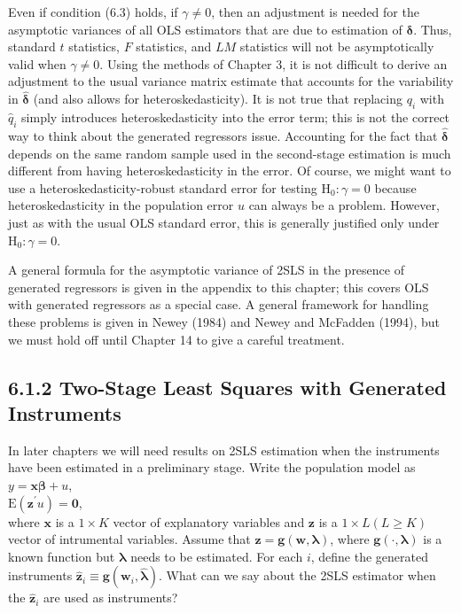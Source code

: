 \documentclass[10pt]{article}
\begin{document}
Even if condition (6.3) holds, if $\gamma \neq 0$, then an adjustment is needed for the asymptotic variances of all OLS estimators that are due to estimation of $\boldsymbol{\delta}$. Thus, standard $t$ statistics, $F$ statistics, and $L M$ statistics will not be asymptotically valid when $\gamma \neq 0$. Using the methods of Chapter 3, it is not difficult to derive an adjustment to the usual variance matrix estimate that accounts for the variability in $\hat{\boldsymbol{\delta}}$ (and also allows for heteroskedasticity). It is not true that replacing $q_{i}$ with $\hat{q}_{i}$ simply introduces heteroskedasticity into the error term; this is not the correct way to think about the generated regressors issue. Accounting for the fact that $\hat{\boldsymbol{\delta}}$ depends on the same random sample used in the second-stage estimation is much different from having heteroskedasticity in the error. Of course, we might want to use a heteroskedasticity-robust standard error for testing $\mathrm{H}_{0}: \gamma=0$ because heteroskedasticity in the population error $u$ can always be a problem. However, just as with the usual OLS standard error, this is generally justified only under $\mathrm{H}_{0}: \gamma=0$.

A general formula for the asymptotic variance of 2SLS in the presence of generated regressors is given in the appendix to this chapter; this covers OLS with generated regressors as a special case. A general framework for handling these problems is given in Newey (1984) and Newey and McFadden (1994), but we must hold off until Chapter 14 to give a careful treatment.

\subsection*{6.1.2 Two-Stage Least Squares with Generated Instruments}
In later chapters we will need results on 2SLS estimation when the instruments have been estimated in a preliminary stage. Write the population model as\\
$y=\mathbf{x} \boldsymbol{\beta}+u$,\\
$\mathrm{E}\left(\mathbf{z}^{\prime} u\right)=\mathbf{0}$,\\
where $\mathbf{x}$ is a $1 \times K$ vector of explanatory variables and $\mathbf{z}$ is a $1 \times L(L \geq K)$ vector of intrumental variables. Assume that $\mathbf{z}=\mathbf{g}(\mathbf{w}, \boldsymbol{\lambda})$, where $\mathbf{g}(\cdot, \boldsymbol{\lambda})$ is a known function but $\boldsymbol{\lambda}$ needs to be estimated. For each $i$, define the generated instruments $\hat{\mathbf{z}}_{i} \equiv \mathbf{g}\left(\mathbf{w}_{i}, \hat{\boldsymbol{\lambda}}\right)$. What can we say about the 2SLS estimator when the $\hat{\mathbf{z}}_{i}$ are used as instruments?
\end{document}
